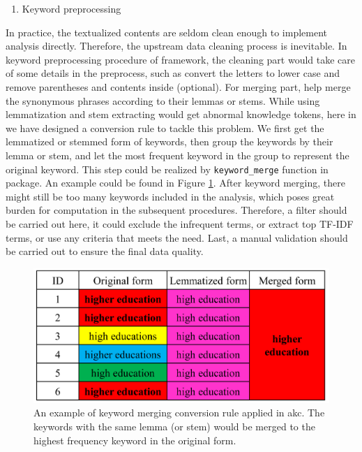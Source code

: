 \begin{enumerate}
\def\labelenumi{(\arabic{enumi})}
\setcounter{enumi}{1}
\tightlist
\item
  Keyword preprocessing
\end{enumerate}

In practice, the textualized contents are seldom clean enough to
implement analysis directly. Therefore, the upstream data cleaning
process is inevitable. In keyword preprocessing procedure of
 framework, the cleaning part would take care of some
details in the preprocess, such as convert the letters to lower case and
remove parentheses and contents inside (optional). For merging part,
 help merge the synonymous phrases according to their
lemmas or stems. While using lemmatization and stem extracting would get
abnormal knowledge tokens, here in  we have designed a
conversion rule to tackle this problem. We first get the lemmatized or
stemmed form of keywords, then group the keywords by their lemma or
stem, and let the most frequent keyword in the group to represent the
original keyword. This step could be realized by \texttt{keyword\_merge}
function in  package. An example could be found in Figure
\ref{fig:fig3}. After keyword merging, there might still be too many
keywords included in the analysis, which poses great burden for
computation in the subsequent procedures. Therefore, a filter should be
carried out here, it could exclude the infrequent terms, or extract top
TF-IDF terms, or use any criteria that meets the need. Last, a manual
validation should be carried out to ensure the final data quality.

\begin{Schunk}
\begin{figure}
\includegraphics[width=1\linewidth,height=0.25\textheight]{fig3} \caption[An example of keyword merging conversion rule applied in akc]{An example of keyword merging conversion rule applied in akc. The keywords with the same lemma (or stem) would be merged to the highest frequency keyword in the original form.}\label{fig:fig3}
\end{figure}
\end{Schunk}

